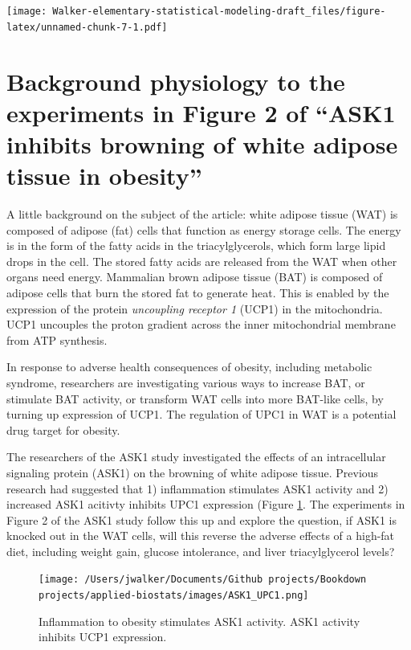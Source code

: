 \documentclass[]{book}
\begin{document}
\texttt{[image: Walker-elementary-statistical-modeling-draft\_files/figure-latex/unnamed-chunk-7-1.pdf]}

\hypertarget{background-physiology-to-the-experiments-in-figure-2-of-ask1-inhibits-browning-of-white-adipose-tissue-in-obesity}{%
\chapter*{Background physiology to the experiments in Figure 2 of ``ASK1 inhibits browning of white adipose tissue in obesity''}\label{background-physiology-to-the-experiments-in-figure-2-of-ask1-inhibits-browning-of-white-adipose-tissue-in-obesity}}

A little background on the subject of the article: white adipose tissue (WAT) is composed of adipose (fat) cells that function as energy storage cells. The energy is in the form of the fatty acids in the triacylglycerols, which form large lipid drops in the cell. The stored fatty acids are released from the WAT when other organs need energy. Mammalian brown adipose tissue (BAT) is composed of adipose cells that burn the stored fat to generate heat. This is enabled by the expression of the protein \emph{uncoupling receptor 1} (UCP1) in the mitochondria. UCP1 uncouples the proton gradient across the inner mitochondrial membrane from ATP synthesis.

In response to adverse health consequences of obesity, including metabolic syndrome, researchers are investigating various ways to increase BAT, or stimulate BAT activity, or transform WAT cells into more BAT-like cells, by turning up expression of UCP1. The regulation of UPC1 in WAT is a potential drug target for obesity.

The researchers of the ASK1 study investigated the effects of an intracellular signaling protein (ASK1) on the browning of white adipose tissue. Previous research had suggested that 1) inflammation stimulates ASK1 activity and 2) increased ASK1 acitivty inhibits UPC1 expression (Figure \ref{fig:ask1-mechanism}. The experiments in Figure 2 of the ASK1 study follow this up and explore the question, if ASK1 is knocked out in the WAT cells, will this reverse the adverse effects of a high-fat diet, including weight gain, glucose intolerance, and liver triacylglycerol levels?

\begin{figure}
\centering
\texttt{[image: /Users/jwalker/Documents/Github projects/Bookdown projects/applied-biostats/images/ASK1\_UPC1.png]}
\caption{\label{fig:ask1-mechanism}Inflammation to obesity stimulates ASK1 activity. ASK1 activity inhibits UCP1 expression.}
\end{figure}
\end{document}
